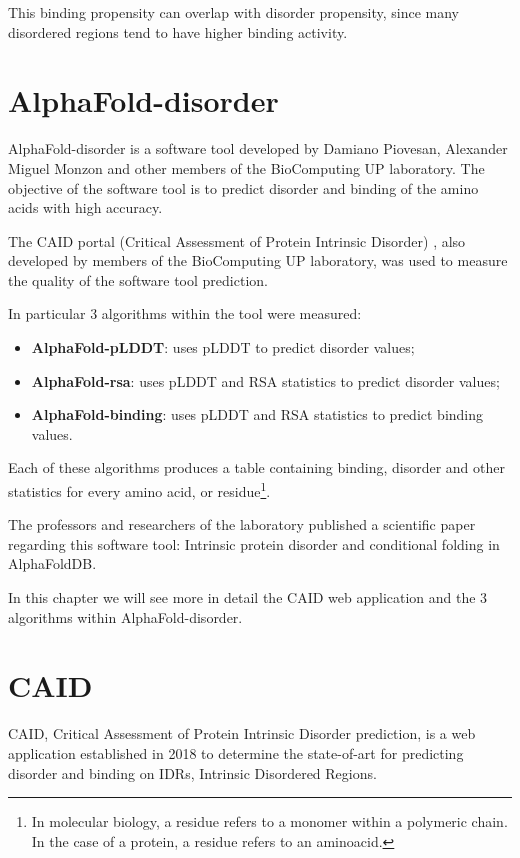 This binding propensity can overlap with disorder propensity, since many disordered regions tend to have higher binding activity.

\section{AlphaFold-disorder}

AlphaFold-disorder is a software tool developed by Damiano Piovesan, Alexander Miguel Monzon and other members of the BioComputing UP laboratory. The objective of the software tool is to predict disorder and binding of the amino acids with high accuracy. 

The CAID portal (Critical Assessment of Protein Intrinsic Disorder) \cite{caid}, also developed by members of the BioComputing UP laboratory, was used to measure the quality of the software tool prediction.

In particular 3 algorithms within the tool were measured: 
\begin{itemize}
    \item \textbf{AlphaFold-pLDDT}: uses pLDDT to predict disorder values;
    \item \textbf{AlphaFold-rsa}: uses pLDDT and RSA statistics to predict disorder values;
    \item \textbf{AlphaFold-binding}: uses pLDDT and RSA statistics to predict binding values.
\end{itemize}

Each of these algorithms produces a table containing binding, disorder and other statistics for every amino acid, or residue\footnote{In molecular biology, a residue refers to a monomer within a polymeric chain. In the case of a protein, a residue refers to an aminoacid.}. 

The professors and researchers of the laboratory published a scientific paper\cite{alphafold-disorder} regarding this software tool: Intrinsic protein disorder and conditional folding in AlphaFoldDB. 

In this chapter we will see more in detail the CAID web application and the 3 algorithms within AlphaFold-disorder.

\section{CAID}
CAID, Critical Assessment of Protein Intrinsic Disorder prediction, is a web application established in 2018 to determine the state-of-art for predicting disorder and binding on IDRs, Intrinsic Disordered Regions. 


